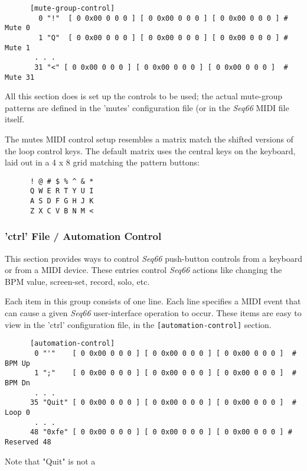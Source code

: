    \begin{verbatim}
      [mute-group-control]
        0 "!"  [ 0 0x00 0 0 0 ] [ 0 0x00 0 0 0 ] [ 0 0x00 0 0 0 ] # Mute 0
        1 "Q"  [ 0 0x00 0 0 0 ] [ 0 0x00 0 0 0 ] [ 0 0x00 0 0 0 ] # Mute 1
       . . .
       31 "<" [ 0 0x00 0 0 0 ] [ 0 0x00 0 0 0 ] [ 0 0x00 0 0 0 ]  # Mute 31
   \end{verbatim}

   All this section does is set up the controls to be used; the actual
   mute-group patterns are defined in the 'mutes' configuration file (or in the
   \textsl{Seq66} MIDI file itself.

   The mutes MIDI control setup resembles a matrix match the shifted versions
   of the loop control keys.  The default matrix
   uses the central keys on the keyboard, laid out in a 4 x 8 grid matching the
   pattern buttons:

   \begin{verbatim}
      ! @ # $ % ^ & *
      Q W E R T Y U I
      A S D F G H J K
      Z X C V B N M <
   \end{verbatim}

\subsubsection{'ctrl' File / Automation Control}
\label{subsubsec:configuration_midi_ctrl_automation}

   This section provides ways to control \textsl{Seq66} push-button controls
   from a keyboard or from a MIDI device.
   These entries control
   \textsl{Seq66} actions like changing the BPM value, screen-set,
   record, solo, etc.
   
   Each item in this group consists of one line.  Each line
   specifies a MIDI event that can cause a given
   \textsl{Seq66} user-interface operation to occur.
   These items are easy to view in the 'ctrl' configuration file,
   in the \texttt{[automation-control]} section.

   \begin{verbatim}
      [automation-control]
       0 "'"    [ 0 0x00 0 0 0 ] [ 0 0x00 0 0 0 ] [ 0 0x00 0 0 0 ]  # BPM Up
       1 ";"    [ 0 0x00 0 0 0 ] [ 0 0x00 0 0 0 ] [ 0 0x00 0 0 0 ]  # BPM Dn
       . . .
      35 "Quit" [ 0 0x00 0 0 0 ] [ 0 0x00 0 0 0 ] [ 0 0x00 0 0 0 ]  # Loop 0
       . . .
      48 "0xfe" [ 0 0x00 0 0 0 ] [ 0 0x00 0 0 0 ] [ 0 0x00 0 0 0 ] # Reserved 48
   \end{verbatim}

   Note that "Quit" is not a 

